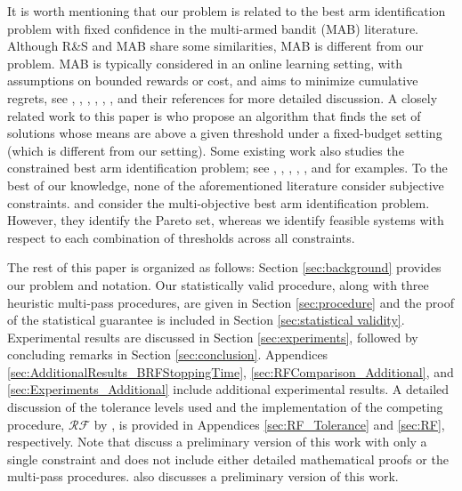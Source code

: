 \documentclass[11pt]{article}
\begin{document}
It is worth mentioning that our problem is related to the best arm identification problem with fixed confidence in the multi-armed bandit (MAB) literature. Although R\&S and MAB share some similarities, MAB is different from our problem. MAB is typically considered in an online learning setting, with assumptions on bounded rewards or cost, and aims to minimize cumulative regrets, see \citet{Gabillon2011, Gabillon2012}, \citet{Kalyanakrishnan2012}, \citet{JamiesonNowak2014}, \citet{GarivierKaufmann2016}, \cite{Agrawal2021}, \citet{QinYou2025}, and their references for more detailed discussion. A closely related work to this paper is \citet{Locatelli2016} who propose an algorithm that finds the set of solutions whose means are above a given threshold under a fixed-budget setting (which is different from our setting). 
Some existing work also studies the constrained best arm identification problem; see \cite{Katz-Samuels2019}, \cite{Wang2022}, \cite{Li2023},  \cite{RussoVannella2024}, \cite{Dharod2024}, and \citet{Yang2025} for examples. To the best of our knowledge, none of the aforementioned literature consider subjective constraints. \citet{Auer2016} and \citet{Kone2023, Kone2024} consider the multi-objective best arm identification problem. However, they identify the Pareto set, whereas we identify feasible systems with respect to each combination of thresholds across all constraints. 

The rest of this paper is organized as follows: Section \ref{sec:background} provides our problem and notation. Our statistically valid procedure, along with three heuristic multi-pass procedures, are given in Section \ref{sec:procedure} and the proof of the statistical guarantee is included in Section \ref{sec:statistical validity}. Experimental results are discussed in Section \ref{sec:experiments}, followed by concluding remarks in Section \ref{sec:conclusion}. Appendices \ref{sec:AdditionalResults_BRFStoppingTime}, \ref{sec:RFComparison_Additional}, and \ref{sec:Experiments_Additional} include additional experimental results.
A detailed discussion of the tolerance levels used and the implementation of the competing procedure, $\mathcal{RF}$ by \citet{zhou2022finding}, is provided in Appendices \ref{sec:RF_Tolerance} and \ref{sec:RF}, respectively. Note that \citet{Kim2024} discuss a preliminary version of this work with only a single constraint and does not include either detailed mathematical proofs or the multi-pass procedures. \citet{Kim2024thesis} also discusses a preliminary version of this work.    
\end{document}
